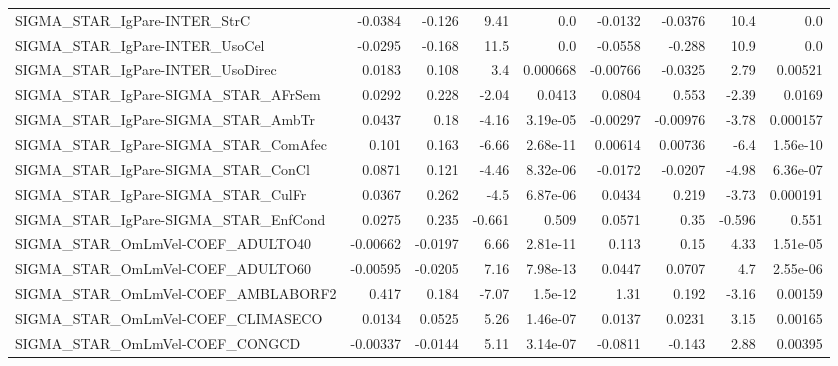 \begin{tabular}{lrrrrrrrr}
SIGMA\_STAR\_IgPare-INTER\_StrC           &     -0.0384 &       -0.126 &     9.41 &      0.0 &    -0.0132 &     -0.0376 &         10.4 &           0.0 \\
SIGMA\_STAR\_IgPare-INTER\_UsoCel         &     -0.0295 &       -0.168 &     11.5 &      0.0 &    -0.0558 &      -0.288 &         10.9 &           0.0 \\
SIGMA\_STAR\_IgPare-INTER\_UsoDirec       &      0.0183 &        0.108 &      3.4 & 0.000668 &   -0.00766 &     -0.0325 &         2.79 &       0.00521 \\
SIGMA\_STAR\_IgPare-SIGMA\_STAR\_AFrSem    &      0.0292 &        0.228 &    -2.04 &   0.0413 &     0.0804 &       0.553 &        -2.39 &        0.0169 \\
SIGMA\_STAR\_IgPare-SIGMA\_STAR\_AmbTr     &      0.0437 &         0.18 &    -4.16 & 3.19e-05 &   -0.00297 &    -0.00976 &        -3.78 &      0.000157 \\
SIGMA\_STAR\_IgPare-SIGMA\_STAR\_ComAfec   &       0.101 &        0.163 &    -6.66 & 2.68e-11 &    0.00614 &     0.00736 &         -6.4 &      1.56e-10 \\
SIGMA\_STAR\_IgPare-SIGMA\_STAR\_ConCl     &      0.0871 &        0.121 &    -4.46 & 8.32e-06 &    -0.0172 &     -0.0207 &        -4.98 &      6.36e-07 \\
SIGMA\_STAR\_IgPare-SIGMA\_STAR\_CulFr     &      0.0367 &        0.262 &     -4.5 & 6.87e-06 &     0.0434 &       0.219 &        -3.73 &      0.000191 \\
SIGMA\_STAR\_IgPare-SIGMA\_STAR\_EnfCond   &      0.0275 &        0.235 &   -0.661 &    0.509 &     0.0571 &        0.35 &       -0.596 &         0.551 \\
SIGMA\_STAR\_OmLmVel-COEF\_ADULTO40       &    -0.00662 &      -0.0197 &     6.66 & 2.81e-11 &      0.113 &        0.15 &         4.33 &      1.51e-05 \\
SIGMA\_STAR\_OmLmVel-COEF\_ADULTO60       &    -0.00595 &      -0.0205 &     7.16 & 7.98e-13 &     0.0447 &      0.0707 &          4.7 &      2.55e-06 \\
SIGMA\_STAR\_OmLmVel-COEF\_AMBLABORF2     &       0.417 &        0.184 &    -7.07 &  1.5e-12 &       1.31 &       0.192 &        -3.16 &       0.00159 \\
SIGMA\_STAR\_OmLmVel-COEF\_CLIMASECO      &      0.0134 &       0.0525 &     5.26 & 1.46e-07 &     0.0137 &      0.0231 &         3.15 &       0.00165 \\
SIGMA\_STAR\_OmLmVel-COEF\_CONGCD         &    -0.00337 &      -0.0144 &     5.11 & 3.14e-07 &    -0.0811 &      -0.143 &         2.88 &       0.00395 \\

\end{tabular}
